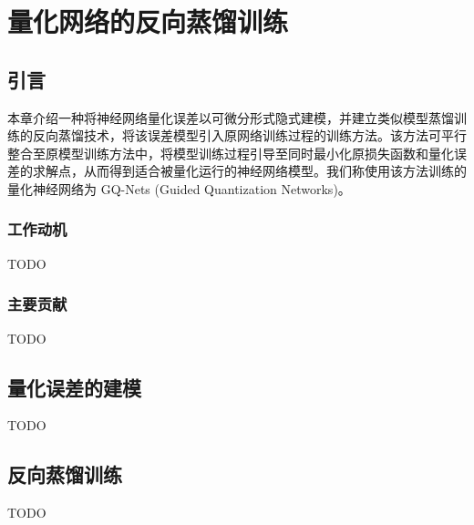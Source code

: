 \chapter{量化网络的反向蒸馏训练}

\section{引言}
本章介绍一种将神经网络量化误差以可微分形式隐式建模，并建立类似模型蒸馏训练的反向蒸馏技术，将该误差模型引入原网络训练过程的训练方法。该方法可平行整合至原模型训练方法中，将模型训练过程引导至同时最小化原损失函数和量化误差的求解点，从而得到适合被量化运行的神经网络模型。我们称使用该方法训练的量化神经网络为 GQ-Nets (Guided Quantization Networks)。
\subsection{工作动机}
TODO
\subsection{主要贡献}
TODO

\section{量化误差的建模}
TODO

\section{反向蒸馏训练}
TODO
